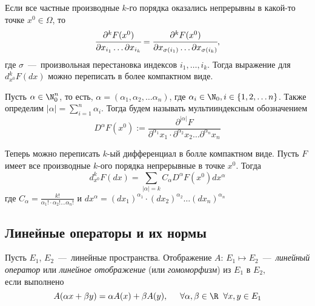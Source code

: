 \begin{note}
    Если все частные производные $k$-го порядка оказались непрерывны в какой-то точке $x^{0} \in \Omega$, то 
    $$ \cfrac{\partial^{k} F (x^{0})}{\partial x_{i_1} \ldots \partial x_{i_k}} = \cfrac{\partial^{k} F (x^{0})}{\partial x_{\sigma(i_1)} \ldots \partial x_{\sigma(i_k)}},$$
    где $\sigma$~---~произвольная перестановка индексов $i_{1}, \ldots, i_{k}$. Тогда выражение для $d_{x^0}^{k} F (dx)$ можно переписать в более компактном виде.
\end{note}


\begin{definition}
    Пусть $\alpha \in \N_{0}^{n}$, то есть, $\alpha = (\alpha_1, \alpha_2, \dots \alpha_n)$, где $\alpha_i \in \N_{0}, i \in \{1, 2, \dots n\}$. Также определим $|\alpha| = \sum_{i = 1}^n \alpha_i$. Тогда будем называть мультииндексным обозначением
    \[D^\alpha F(x^0) := \frac{\partial^{|\alpha|} F}{\partial^{\alpha_1}x_1 \cdot \partial^{\alpha_2} x_2 \dots \partial^{\alpha_n}x_n}\]
\end{definition}

\begin{note} 
    Теперь можно переписать $k$-ый дифференциал в болле компактном виде.
    Пусть $F$ имеет все производные $k$-ого порядка непрерывные в точке $x^{0}$. Тогда \[d_{x^0}^k F(d x) = \sum_{|\alpha| = k} C_{\alpha} D^{\alpha} F(x^0) dx^{\alpha}\]
    где $C_{\alpha} = \frac{k!}{\alpha_1! \cdot \alpha_2! \dots \alpha_n!}$ и $dx^{\alpha} = (dx_1)^{\alpha_1} \cdot (dx_2)^{\alpha_2} \dots (dx_n)^{\alpha_n}$
    
\end{note}

\subsection{Линейные операторы и их нормы}

\begin{definition}
    Пусть $E_1$, $E_2$~---~линейные пространства. 
    Отображение $A$: $E_1 \mapsto E_2$~---~\textit{линейный оператор} или \textit{линейное отображение} (или \textit{гомоморфизм}) из $E_1$ в $E_2$, \\
    если выполнено \[A(\alpha x + \beta y) = \alpha A(x) + \beta A(y), \hspace{0.5cm} \forall \alpha, \beta \in \R \hspace{0.2cm} \forall x, y \in E_1\]
\end{definition}


